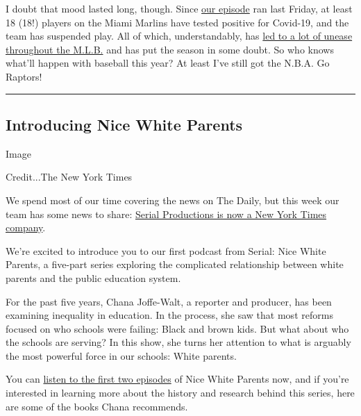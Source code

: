 I doubt that mood lasted long, though. Since
\href{https://www.nytimes.com/2020/07/24/podcasts/the-daily/mlb-baseball-season-coronavirus.html?action=click\&module=audio-series-bar\&region=header\&pgtype=Article}{our
episode} ran last Friday, at least 18 (18!) players on the Miami Marlins
have tested positive for Covid-19, and the team has suspended play. All
of which, understandably, has
\href{https://www.nytimes.com/2020/07/28/sports/baseball/marlins-outbreak-mlb-coronavirus.html}{led
to a lot of unease throughout the M.L.B.} and has put the season in some
doubt. So who knows what'll happen with baseball this year? At least
I've still got the N.B.A. Go Raptors!

\begin{center}\rule{0.5\linewidth}{\linethickness}\end{center}

\hypertarget{introducing-nice-white-parents}{%
\subsection{Introducing Nice White
Parents}\label{introducing-nice-white-parents}}

Image

Credit...The New York Times

We spend most of our time covering the news on The Daily, but this week
our team has some news to share:
\href{https://www.nytimes.com/2020/07/22/business/media/new-york-times-serial.html}{Serial
Productions is now a New York Times company}.

We're excited to introduce you to our first podcast from Serial: Nice
White Parents, a five-part series exploring the complicated relationship
between white parents and the public education system.

For the past five years, Chana Joffe-Walt, a reporter and producer, has
been examining inequality in education. In the process, she saw that
most reforms focused on who schools were failing: Black and brown kids.
But what about who the schools are serving? In this show, she turns her
attention to what is arguably the most powerful force in our schools:
White parents.

You can
\href{https://www.nytimes.com/2020/07/30/podcasts/nice-white-parents-serial.html}{listen
to the first two episodes} of Nice White Parents now, and if you're
interested in learning more about the history and research behind this
series, here are some of the books Chana recommends.

